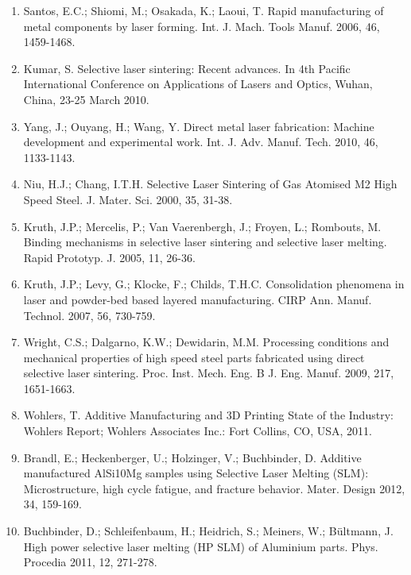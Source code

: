 \documentclass[10pt]{article}
\begin{document}
\begin{enumerate}
  \item Santos, E.C.; Shiomi, M.; Osakada, K.; Laoui, T. Rapid manufacturing of metal components by laser forming. Int. J. Mach. Tools Manuf. 2006, 46, 1459-1468.

  \item Kumar, S. Selective laser sintering: Recent advances. In 4th Pacific International Conference on Applications of Lasers and Optics, Wuhan, China, 23-25 March 2010.

  \item Yang, J.; Ouyang, H.; Wang, Y. Direct metal laser fabrication: Machine development and experimental work. Int. J. Adv. Manuf. Tech. 2010, 46, 1133-1143.

  \item Niu, H.J.; Chang, I.T.H. Selective Laser Sintering of Gas Atomised M2 High Speed Steel. J. Mater. Sci. 2000, 35, 31-38.

  \item Kruth, J.P.; Mercelis, P.; Van Vaerenbergh, J.; Froyen, L.; Rombouts, M. Binding mechanisms in selective laser sintering and selective laser melting. Rapid Prototyp. J. 2005, 11, 26-36.

  \item Kruth, J.P.; Levy, G.; Klocke, F.; Childs, T.H.C. Consolidation phenomena in laser and powder-bed based layered manufacturing. CIRP Ann. Manuf. Technol. 2007, 56, 730-759.

  \item Wright, C.S.; Dalgarno, K.W.; Dewidarin, M.M. Processing conditions and mechanical properties of high speed steel parts fabricated using direct selective laser sintering. Proc. Inst. Mech. Eng. B J. Eng. Manuf. 2009, 217, 1651-1663.

  \item Wohlers, T. Additive Manufacturing and 3D Printing State of the Industry: Wohlers Report; Wohlers Associates Inc.: Fort Collins, CO, USA, 2011.

  \item Brandl, E.; Heckenberger, U.; Holzinger, V.; Buchbinder, D. Additive manufactured AlSi10Mg samples using Selective Laser Melting (SLM): Microstructure, high cycle fatigue, and fracture behavior. Mater. Design 2012, 34, 159-169.

  \item Buchbinder, D.; Schleifenbaum, H.; Heidrich, S.; Meiners, W.; Bültmann, J. High power selective laser melting (HP SLM) of Aluminium parts. Phys. Procedia 2011, 12, 271-278.


\end{enumerate}
\end{document}
